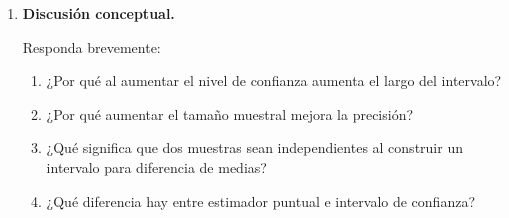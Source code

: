 \documentclass[11pt]{article}
\begin{document}
\begin{enumerate}[label=\textbf{Ejercicio \arabic*.}, leftmargin=*]
    \item \textbf{Discusión conceptual.}
    
    Responda brevemente:
    \begin{enumerate}[label=\alph*)]
        \item ¿Por qué al aumentar el nivel de confianza aumenta el largo del intervalo?
        \item ¿Por qué aumentar el tamaño muestral mejora la precisión?
        \item ¿Qué significa que dos muestras sean independientes al construir un intervalo para diferencia de medias?
        \item ¿Qué diferencia hay entre estimador puntual e intervalo de confianza?
    \end{enumerate}
\end{enumerate}
\end{document}
